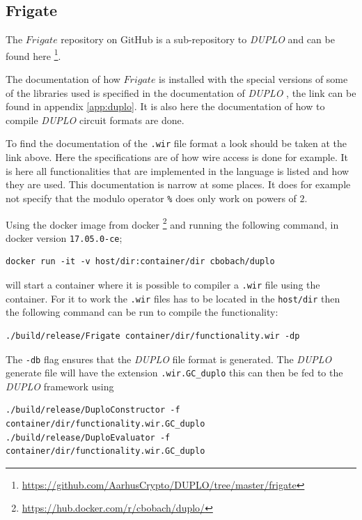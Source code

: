 \documentclass[twoside,11pt,openright]{report}
\newcommand{\DUPLO}{\textit{DUPLO} }
\begin{document}
\begin{appendices}
\section{Frigate}
\label{app:frigate}
The $Frigate$ repository on GitHub is a sub-repository to \DUPLO and can be found here \footnote{\url{https://github.com/AarhusCrypto/DUPLO/tree/master/frigate}}.

The documentation of how $Frigate$ is installed with the special versions of some of the libraries used is specified in the documentation of \DUPLO, the link can be found in appendix \ref{app:duplo}. It is also here the documentation of how to compile \DUPLO circuit formats are done.

To find the documentation of the \verb|.wir| file format a look should be taken at the link above. Here the specifications are of how wire access is done for example. It is here all functionalities that are implemented in the language is listed and how they are used. This documentation is narrow at some places. It does for example not specify that the modulo operator \verb|%| does only work on powers of $2$.

\bigskip

Using the docker image from docker \footnote{\url{https://hub.docker.com/r/cbobach/duplo/}} and running the following command, in docker version \verb|17.05.0-ce|;

\begin{center}
\begin{verbatim}
docker run -it -v host/dir:container/dir cbobach/duplo
\end{verbatim}
\end{center}

will start a container where it is possible to compiler a \verb|.wir| file using the container. For it to work the \verb|.wir| files has to be located in the \verb|host/dir| then the following command can be run to compile the functionality:

\begin{center}
\begin{verbatim}
./build/release/Frigate container/dir/functionality.wir -dp
\end{verbatim}
\end{center}

The \verb|-db| flag ensures that the \DUPLO file format is generated. The \DUPLO generate file will have the extension \verb|.wir.GC_duplo| this can then be fed to the \DUPLO framework using

\begin{center}
\begin{verbatim}
./build/release/DuploConstructor -f container/dir/functionality.wir.GC_duplo
./build/release/DuploEvaluator -f container/dir/functionality.wir.GC_duplo
\end{verbatim}
\end{center}


\end{appendices}
\end{document}
